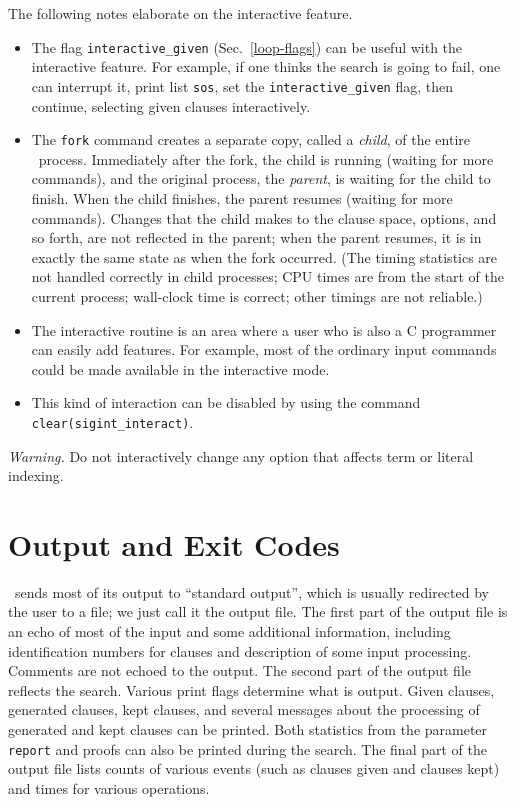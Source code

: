 \documentclass[11pt]{article}
\begin{document}
\noindent The following notes elaborate on the interactive feature.
\begin{itemize}
\item 
The flag \verb:interactive_given: (Sec.~\ref{loop-flags})
can be useful with the interactive feature.  For example, if one
thinks the search is going to fail, one can interrupt it, print
list \verb:sos:, set the \verb:interactive_given: flag, then continue,
selecting given clauses interactively.
\item
The \verb:fork: command creates a separate copy, called a {\em child},
of the entire \otter\ process.  Immediately after the fork, the child
is running (waiting for more commands), and the original process, the
{\em parent}, is waiting for the child to finish.  When the child
finishes, the parent resumes (waiting for more commands).  Changes
that the child makes to the clause space, options, and so forth, are not
reflected in the parent; when the parent resumes, it is in exactly the
same state as when the fork occurred.  (The timing statistics are not
handled correctly in child processes; CPU times are from the start of
the current process; wall-clock time is correct; other timings are
not reliable.)
\item
The interactive routine is an area where a user who is also a C
programmer can easily add features.  For example, most of the ordinary
input commands could be made available in the interactive mode.
\item
This kind of interaction can be disabled by using the command
\verb:clear(sigint_interact):.
\end{itemize}
{\em Warning.}  Do not interactively change
any option that affects term or literal indexing.

\section{Output and Exit Codes} \label{output}

\otter\ sends most of its output to ``standard output'', which
is usually redirected by the user to a file; we just call it 
the output file.  The first part of the output file is an echo of
most of the input and some additional information, including
identification numbers for clauses and description of some input
processing.  Comments are not echoed to the output.
The second part of the output file reflects the search.
Various print flags determine what is output.  Given clauses,
generated clauses, kept clauses, and several messages about the
processing of generated and kept clauses can be printed.
Both statistics from the parameter \verb:report: and proofs can
also be printed during the search.  The final part of the output
file lists counts of various events (such as clauses given and
clauses kept) and times for various operations.
\end{document}
